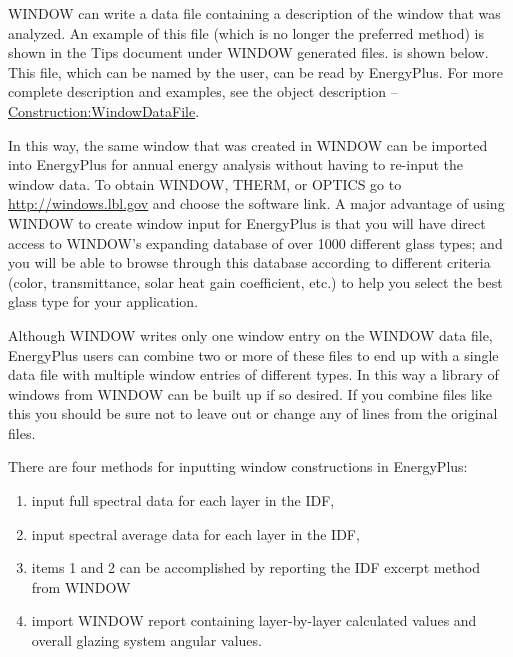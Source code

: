 WINDOW can write a data file containing a description of the window that was analyzed. An example of this file (which is no longer the preferred method) is shown in the Tips document under WINDOW generated files. is shown below. This file, which can be named by the user, can be read by EnergyPlus. For more complete description and examples, see the object description -- \hyperref[constructionwindowdatafile]{Construction:WindowDataFile}.

In this way, the same window that was created in WINDOW can be imported into EnergyPlus for annual energy analysis without having to re-input the window data. To obtain WINDOW, THERM, or OPTICS go to \url{http://windows.lbl.gov} and choose the software link. A major advantage of using WINDOW to create window input for EnergyPlus is that you will have direct access to WINDOW's expanding database of over 1000 different glass types; and you will be able to browse through this database according to different criteria (color, transmittance, solar heat gain coefficient, etc.) to help you select the best glass type for your application.

Although WINDOW writes only one window entry on the WINDOW data file, EnergyPlus users can combine two or more of these files to end up with a single data file with multiple window entries of different types. In this way a library of windows from WINDOW can be built up if so desired. If you combine files like this you should be sure not to leave out or change any of lines from the original files.

There are four methods for inputting window constructions in EnergyPlus:

\begin{enumerate}
\tightlist
\item
  input full spectral data for each layer in the IDF,
\item
  input spectral average data for each layer in the IDF,
\item
  items 1 and 2 can be accomplished by reporting the IDF excerpt method from WINDOW
\item
  import WINDOW report containing layer-by-layer calculated values and overall glazing system angular values.
\end{enumerate}

\begin{callout}
\end{callout}

